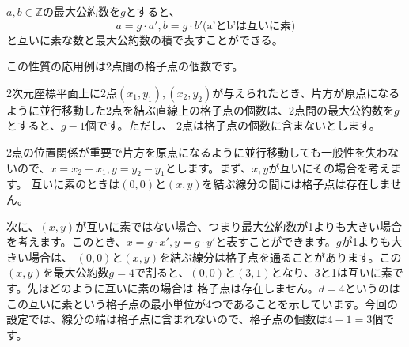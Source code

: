 \documentclass{jlreq}
\begin{document}
\begin{theorembox}
    $a, b \in \mathbb{Z}$の最大公約数を$g$とすると、
    \begin{equation*}
        a = g \cdot a', b = g \cdot b' \text{(a'とb'は互いに素)}
    \end{equation*}
    と互いに素な数と最大公約数の積で表すことができる。
\end{theorembox}

この性質の応用例は2点間の格子点の個数です。

2次元座標平面上に2点$(x_1, y_1), (x_2, y_2)$が与えられたとき、片方が原点になるように並行移動した2点を結ぶ直線上の格子点の個数は、2点間の最大公約数を$g$とすると、$g - 1$個です。ただし、
2点は格子点の個数に含まないとします。

2点の位置関係が重要で片方を原点になるように並行移動しても一般性を失わないので、$x = x_2 - x_1, y = y_2 - y_1$とします。まず、$x, y$が互いにその場合を考えます。
互いに素のときは$(0, 0)$と$(x, y)$を結ぶ線分の間には格子点は存在しません。

\vspace{0.5cm}

\begin{center}
\end{center}

\vspace{0.5cm}

次に、$(x, y)$が互いに素ではない場合、つまり最大公約数が1よりも大きい場合を考えます。このとき、$x = g \cdot x', y = g \cdot y'$と表すことができます。$g$が1よりも大きい場合は、
$(0, 0)$と$(x, y)$を結ぶ線分は格子点を通ることがあります。この$(x, y)$を最大公約数$g = 4$で割ると、$(0, 0)$と$(3, 1)$となり、3と1は互いに素です。先ほどのように互いに素の場合は
格子点は存在しません。$d = 4$というのはこの互いに素という格子点の最小単位が4つであることを示しています。今回の設定では、線分の端は格子点に含まれないので、格子点の個数は$4 - 1 = 3$個です。
\end{document}
